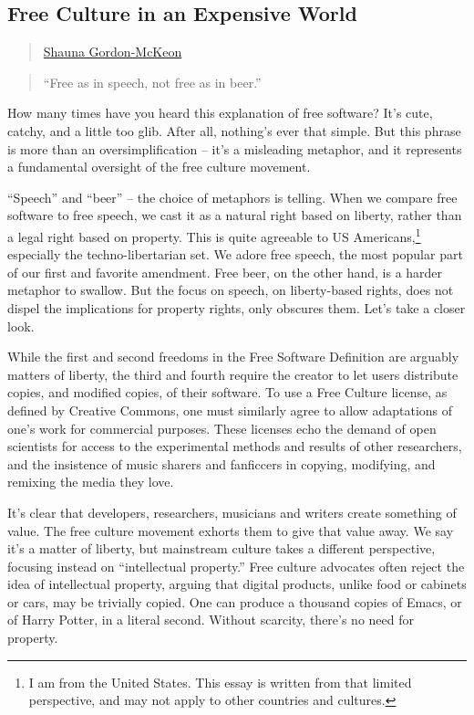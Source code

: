 \subsection{Free Culture in an Expensive
World}\label{free-culture-in-an-expensive-world}

\begin{quote}
\hyperlink{shauna-gordon-mckeon}{Shauna
Gordon-McKeon}
\end{quote}

\begin{quote}
``Free as in speech, not free as in beer.''
\end{quote}

How many times have you heard this explanation of free software? It's
cute, catchy, and a little too glib. After all, nothing's ever that
simple. But this phrase is more than an oversimplification -- it's a
misleading metaphor, and it represents a fundamental oversight of the
free culture movement.

``Speech'' and ``beer'' -- the choice of metaphors is telling. When we
compare free software to free speech, we cast it as a natural right
based on liberty, rather than a legal right based on property. This is
quite agreeable to US Americans,\footnote{I am from the United States.
  This essay is written from that limited perspective, and may not apply
  to other countries and cultures.} especially the techno-libertarian
set. We adore free speech, the most popular part of our first and
favorite amendment. Free beer, on the other hand, is a harder metaphor
to swallow. But the focus on speech, on liberty-based rights, does not
dispel the implications for property rights, only obscures them. Let's
take a closer look.

While the first and second freedoms in the Free Software Definition are
arguably matters of liberty, the third and fourth require the creator to
let users distribute copies, and modified copies, of their software. To
use a Free Culture license, as defined by Creative Commons, one must
similarly agree to allow adaptations of one's work for commercial
purposes. These licenses echo the demand of open scientists for access
to the experimental methods and results of other researchers, and the
insistence of music sharers and fanficcers in copying, modifying, and
remixing the media they love.

It's clear that developers, researchers, musicians and writers create
something of value. The free culture movement exhorts them to give that
value away. We say it's a matter of liberty, but mainstream culture
takes a different perspective, focusing instead on ``intellectual
property.'' Free culture advocates often reject the idea of intellectual
property, arguing that digital products, unlike food or cabinets or
cars, may be trivially copied. One can produce a thousand copies of
Emacs, or of Harry Potter, in a literal second. Without scarcity,
there's no need for property.

